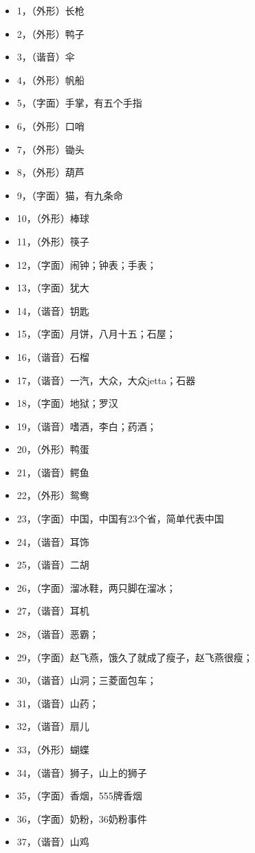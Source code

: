 \begin{itemize}
\item 1，（外形）长枪
\item 2，（外形）鸭子
\item 3，（谐音）伞
\item 4，（外形）帆船
\item 5，（字面）手掌，有五个手指
\item 6，（外形）口哨
\item 7，（外形）锄头
\item 8，（外形）葫芦
\item 9，（字面）猫，有九条命
\item 10，（外形）棒球
\item 11，（外形）筷子
\item 12，（字面）闹钟；钟表；手表；
\item 13，（字面）犹大
\item 14，（谐音）钥匙
\item 15，（字面）月饼，八月十五；石屋；
\item 16，（谐音）石榴
\item 17，（谐音）一汽，大众，大众jetta；石器
\item 18，（字面）地狱；罗汉
\item 19，（谐音）嗜酒，李白；药酒；
\item 20，（外形）鸭蛋
\item 21，（谐音）鳄鱼
\item 22，（外形）鸳鸯
\item 23，（字面）中国，中国有23个省，简单代表中国
\item 24，（谐音）耳饰
\item 25，（谐音）二胡
\item 26，（字面）溜冰鞋，两只脚在溜冰；
\item 27，（谐音）耳机
\item 28，（谐音）恶霸；
\item 29，（字面）赵飞燕，饿久了就成了瘦子，赵飞燕很瘦；
\item 30，（谐音）山洞；三菱面包车；
\item 31，（谐音）山药；
\item 32，（谐音）扇儿
\item 33，（外形）蝴蝶
\item 34，（谐音）狮子，山上的狮子
\item 35，（字面）香烟，555牌香烟
\item 36，（字面）奶粉，36奶粉事件
\item 37，（谐音）山鸡

\end{itemize}
